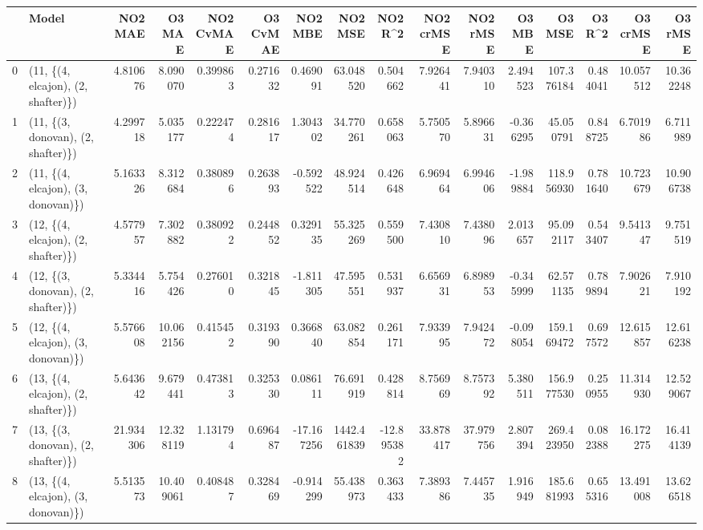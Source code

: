 \begin{tabular}{llrrrrrrrrrrrrrr}
\toprule
{} &                               Model &    NO2 MAE &     O3 MAE &  NO2 CvMAE &  O3 CvMAE &    NO2 MBE &      NO2 MSE &    NO2 R\textasciicircum2 &  NO2 crMSE &   NO2 rMSE &     O3 MBE &      O3 MSE &    O3 R\textasciicircum2 &   O3 crMSE &    O3 rMSE \\
\midrule
0  &  (11, \{(4, elcajon), (2, shafter)\}) &   4.810676 &   8.090070 &   0.399863 &  0.271632 &   0.469091 &    63.048520 &   0.504662 &   7.926441 &   7.940310 &   2.494523 &  107.376184 &  0.484041 &  10.057512 &  10.362248 \\
1  &  (11, \{(3, donovan), (2, shafter)\}) &   4.299718 &   5.035177 &   0.222474 &  0.281617 &   1.304302 &    34.770261 &   0.658063 &   5.750570 &   5.896631 &  -0.366295 &   45.050791 &  0.848725 &   6.701986 &   6.711989 \\
2  &  (11, \{(4, elcajon), (3, donovan)\}) &   5.163326 &   8.312684 &   0.380896 &  0.263893 &  -0.592522 &    48.924514 &   0.426648 &   6.969464 &   6.994606 &  -1.989884 &  118.956930 &  0.781640 &  10.723679 &  10.906738 \\
3  &  (12, \{(4, elcajon), (2, shafter)\}) &   4.577957 &   7.302882 &   0.380922 &  0.244852 &   0.329135 &    55.325269 &   0.559500 &   7.430810 &   7.438096 &   2.013657 &   95.092117 &  0.543407 &   9.541347 &   9.751519 \\
4  &  (12, \{(3, donovan), (2, shafter)\}) &   5.334416 &   5.754426 &   0.276010 &  0.321845 &  -1.811305 &    47.595551 &   0.531937 &   6.656931 &   6.898953 &  -0.345999 &   62.571135 &  0.789894 &   7.902621 &   7.910192 \\
5  &  (12, \{(4, elcajon), (3, donovan)\}) &   5.576608 &  10.062156 &   0.415452 &  0.319390 &   0.366840 &    63.082854 &   0.261171 &   7.933995 &   7.942472 &  -0.098054 &  159.169472 &  0.697572 &  12.615857 &  12.616238 \\
6  &  (13, \{(4, elcajon), (2, shafter)\}) &   5.643642 &   9.679441 &   0.473813 &  0.325330 &   0.086111 &    76.691919 &   0.428814 &   8.756969 &   8.757392 &   5.380511 &  156.977530 &  0.250955 &  11.314930 &  12.529067 \\
7  &  (13, \{(3, donovan), (2, shafter)\}) &  21.934306 &  12.328119 &   1.131794 &  0.696487 & -17.167256 &  1442.461839 & -12.895382 &  33.878417 &  37.979756 &   2.807394 &  269.423950 &  0.082388 &  16.172275 &  16.414139 \\
8  &  (13, \{(4, elcajon), (3, donovan)\}) &   5.513573 &  10.409061 &   0.408487 &  0.328469 &  -0.914299 &    55.438973 &   0.363433 &   7.389386 &   7.445735 &   1.916949 &  185.681993 &  0.655316 &  13.491008 &  13.626518 \\

\end{tabular}
